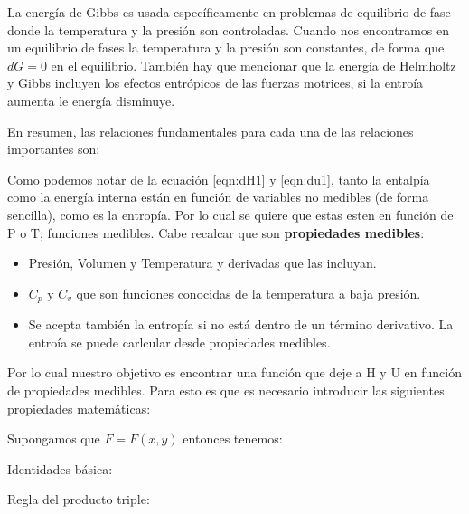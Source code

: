 La energía de Gibbs es usada específicamente en problemas de equilibrio de fase donde la temperatura y la presión son controladas. Cuando nos encontramos en un equilibrio de fases la temperatura y la presión son constantes, de forma que $dG=0$ en el equilibrio. También hay que mencionar que la energía de Helmholtz y Gibbs incluyen los efectos entrópicos de las fuerzas motrices, si la entroía aumenta le energía disminuye.

En resumen, las relaciones fundamentales para cada una de las relaciones importantes son:


Como podemos notar de la ecuación \ref{eqn:dH1} y \ref{eqn:du1}, tanto la entalpía como la energía interna están en función de variables no medibles (de forma sencilla), como es la entropía. Por lo cual se quiere que estas esten en función de P o T, funciones medibles. Cabe recalcar que son \textbf{propiedades medibles}:

\begin{itemize}
    \item Presión, Volumen y Temperatura y derivadas que las incluyan.
    \item $C_p$ y $C_v$ que son funciones conocidas de la temperatura a baja presión.
    \item Se acepta también la entropía si no está dentro de un término derivativo. La entroía se puede carlcular desde propiedades medibles.
\end{itemize}

Por lo cual nuestro objetivo es encontrar una función que deje a H y U en función de propiedades medibles. Para esto es que es necesario introducir las siguientes propiedades matemáticas:

Supongamos que $F=F(x,y)$ entonces tenemos:

Identidades básica:



Regla del producto triple:

